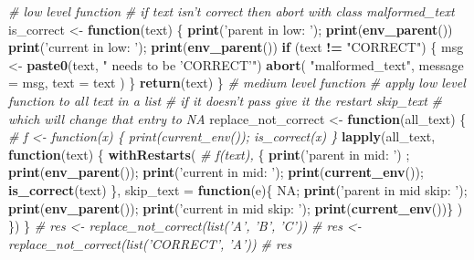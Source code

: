 \documentclass[]{book}
\newenvironment{Shaded}{\begin{snugshade}}{\end{snugshade}}
\newcommand{\CommentTok}[1]{\textcolor[rgb]{0.56,0.35,0.01}{\textit{#1}}}
\newcommand{\ControlFlowTok}[1]{\textcolor[rgb]{0.13,0.29,0.53}{\textbf{#1}}}
\newcommand{\DataTypeTok}[1]{\textcolor[rgb]{0.13,0.29,0.53}{#1}}
\newcommand{\KeywordTok}[1]{\textcolor[rgb]{0.13,0.29,0.53}{\textbf{#1}}}
\newcommand{\NormalTok}[1]{#1}
\newcommand{\OperatorTok}[1]{\textcolor[rgb]{0.81,0.36,0.00}{\textbf{#1}}}
\newcommand{\OtherTok}[1]{\textcolor[rgb]{0.56,0.35,0.01}{#1}}
\newcommand{\StringTok}[1]{\textcolor[rgb]{0.31,0.60,0.02}{#1}}
\begin{document}
\begin{Shaded}
\begin{Highlighting}[]
\CommentTok{# low level function}
\CommentTok{# if text isn't correct then abort with class malformed_text}
\NormalTok{is_correct <-}\StringTok{ }\ControlFlowTok{function}\NormalTok{(text) \{}
  \KeywordTok{print}\NormalTok{(}\StringTok{'parent in low: '}\NormalTok{); }\KeywordTok{print}\NormalTok{(}\KeywordTok{env_parent}\NormalTok{())}
  \KeywordTok{print}\NormalTok{(}\StringTok{'current in low: '}\NormalTok{); }\KeywordTok{print}\NormalTok{(}\KeywordTok{env_parent}\NormalTok{())}
  \ControlFlowTok{if}\NormalTok{ (text }\OperatorTok{!=}\StringTok{ "CORRECT"}\NormalTok{) \{}
\NormalTok{    msg <-}\StringTok{ }\KeywordTok{paste0}\NormalTok{(text, }\StringTok{" needs to be 'CORRECT'"}\NormalTok{)}
    \KeywordTok{abort}\NormalTok{(}
      \StringTok{"malformed_text"}\NormalTok{,}
      \DataTypeTok{message =}\NormalTok{ msg,}
      \DataTypeTok{text =}\NormalTok{ text}
\NormalTok{    )}
\NormalTok{  \}}
  \KeywordTok{return}\NormalTok{(text)}
\NormalTok{\}}
\CommentTok{# medium level function}
\CommentTok{# apply low level function to all text in a list}
\CommentTok{# if it doesn't pass give it the restart skip_text}
\CommentTok{# which will change that entry to NA}
\NormalTok{replace_not_correct <-}\StringTok{ }\ControlFlowTok{function}\NormalTok{(all_text) \{}
  \CommentTok{# f <- function(x) \{ print(current_env()); is_correct(x) \}}
  \KeywordTok{lapply}\NormalTok{(all_text, }\ControlFlowTok{function}\NormalTok{(text) \{}
    \KeywordTok{withRestarts}\NormalTok{(}
      \CommentTok{# f(text),}
\NormalTok{      \{ }\KeywordTok{print}\NormalTok{(}\StringTok{'parent in mid: '}\NormalTok{) ; }\KeywordTok{print}\NormalTok{(}\KeywordTok{env_parent}\NormalTok{()); }\KeywordTok{print}\NormalTok{(}\StringTok{'current in mid: '}\NormalTok{); }\KeywordTok{print}\NormalTok{(}\KeywordTok{current_env}\NormalTok{()); }\KeywordTok{is_correct}\NormalTok{(text) \},}
      \DataTypeTok{skip_text =} \ControlFlowTok{function}\NormalTok{(e)\{ }\OtherTok{NA}\NormalTok{;  }\KeywordTok{print}\NormalTok{(}\StringTok{'parent in mid skip: '}\NormalTok{); }\KeywordTok{print}\NormalTok{(}\KeywordTok{env_parent}\NormalTok{()); }\KeywordTok{print}\NormalTok{(}\StringTok{'current in mid skip: '}\NormalTok{); }\KeywordTok{print}\NormalTok{(}\KeywordTok{current_env}\NormalTok{())\}}
\NormalTok{    )}
\NormalTok{  \})}
\NormalTok{\}}
\CommentTok{# res <- replace_not_correct(list('A', 'B', 'C'))}
\CommentTok{# res <- replace_not_correct(list('CORRECT', 'A'))}
\CommentTok{# res}

\end{Highlighting}
\end{Shaded}
\end{document}
